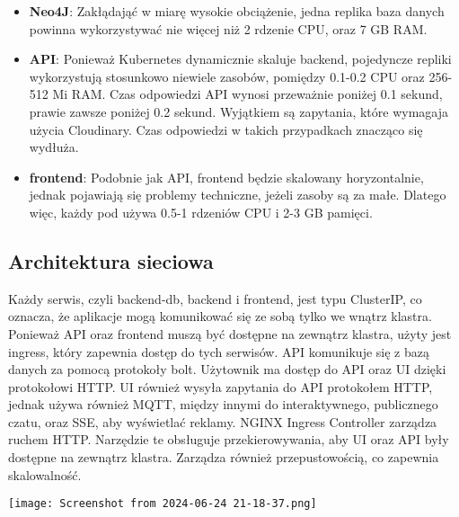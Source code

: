 \documentclass[12pt,a4paper]{article}
\begin{document}
\begin{itemize}
    \item \textbf{Neo4J}: Zakłądająć w miarę wysokie obciążenie, jedna replika baza danych powinna wykorzystywać nie więcej niż 2 rdzenie CPU, oraz 7 GB RAM.
    \item \textbf{API}: Ponieważ Kubernetes dynamicznie skaluje backend, pojedyncze repliki wykorzystują stosunkowo niewiele zasobów, pomiędzy 0.1-0.2 CPU oraz 256-512 Mi RAM. Czas odpowiedzi API wynosi przeważnie poniżej 0.1 sekund, prawie zawsze poniżej 0.2 sekund. Wyjątkiem są zapytania, które wymagaja użycia Cloudinary. Czas odpowiedzi w takich przypadkach znacząco się wydłuża.
    \item \textbf{frontend}: Podobnie jak API, frontend będzie skalowany horyzontalnie, jednak pojawiają się problemy techniczne, jeżeli zasoby są za małe. Dlatego więc, każdy pod używa 0.5-1 rdzeniów CPU i 2-3 GB pamięci.
\end{itemize}


\subsection{Architektura sieciowa}
\label{sec:ExampleResults}

Każdy serwis, czyli backend-db, backend i frontend, jest typu ClusterIP, co oznacza, że aplikacje mogą komunikować się ze sobą tylko we wnątrz klastra. Ponieważ API oraz frontend muszą być dostępne na zewnątrz klastra, użyty jest ingress, który zapewnia dostęp do tych serwisów.
API komunikuje się z bazą danych za pomocą protokoły bolt. Użytownik ma dostęp do API oraz UI dzięki protokołowi HTTP. UI również wysyła zapytania do API protokołem HTTP, jednak używa również MQTT, między innymi do interaktywnego, publicznego czatu, oraz SSE, aby wyświetlać reklamy.
NGINX Ingress Controller zarządza ruchem HTTP. Narzędzie te obsługuje przekierowywania, aby UI oraz API były dostępne na zewnątrz klastra. Zarządza również przepustowością, co zapewnia skalowalność.

\texttt{[image: Screenshot from 2024-06-24 21-18-37.png]}
\end{document}
